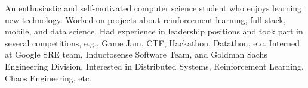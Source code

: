 

\begin{cvparagraph}

An enthusiastic and self-motivated computer science student who enjoys learning new technology. 
Worked on projects about reinforcement learning, full-stack, mobile, and data science. Had experience in leadership positions and took part in several competitions, e.g., Game Jam, CTF, Hackathon, Datathon, etc. Interned at Google SRE team, Inductosense Software Team, and Goldman Sachs Engineering Division. Interested in Distributed Systems, Reinforcement Learning, Chaos Engineering, etc.
\end{cvparagraph}
